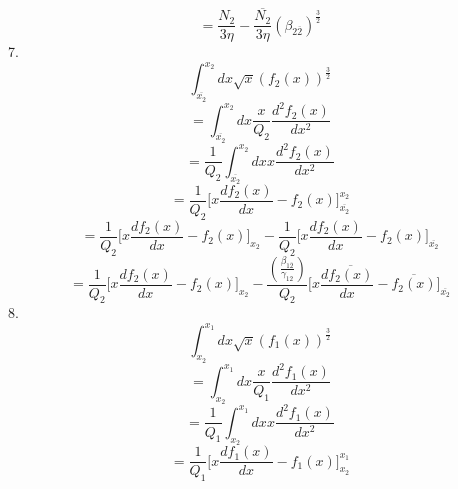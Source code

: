 \documentclass[fleqn, 10pt]{article}
\begin{document}
 \begin{equation}
     = \frac{N_2}{3 \eta} - \frac{\overline{N_2}}{3 \eta} (\beta_{2\overline{2}})^\frac{3}{2}
     \label{91}
 \end{equation}        
 7.              \begin{equation*}
                \int^{x_2}_{\overline{x_2}} dx \sqrt{x} (f_2(x))^\frac{3}{2} 
                \end{equation*}
                \begin{equation*}
                = \int^{x_2}_{\overline{x_2}} dx \frac{x}{Q_2} \frac{d^2f_2(x)}{dx^2} 
                \end{equation*}
                \begin{equation*}
                = \frac{1}{Q_2} \int^{x_2}_{\overline{x_2}} dx x \frac{d^2f_2(x)}{dx^2}
                \end{equation*}
                \begin{equation*}
                = \frac{1}{Q_2} \biggl[ x \frac{df_2(x)}{dx} - f_2(x) \biggr]^{x_2}_{\overline{x_2}}
                \end{equation*}
                \begin{equation*}
                    = \frac{1}{Q_2} \biggl[x \frac{df_2(x)}{dx} - f_2(x) \biggr]_{x_2} - \frac{1}{Q_2} \biggl[x\frac{df_2(x)}{dx} - f_2(x) \biggr]_{\overline{x_2}}
                \end{equation*}
                \begin{equation}
                    = \frac{1}{Q_2} \biggl[x \frac{df_2(x)}{dx} - f_2(x) \biggr]_{x_2} - \frac{\left(\frac{\beta_{1\overline{2}}}{\gamma_{12}}\right)}{Q_2} \Biggl[x \frac{d\overline{f_2(x)}}{dx} - \overline{f_2(x)} \Biggr]_{\overline{x_2}}
                \end{equation}
    8.            \begin{equation*}
               \int^{x_1}_{x_2} dx \sqrt{x} (f_1(x))^\frac{3}{2} 
           \end{equation*}
           \begin{equation*}
               = \int^{x_1}_{x_2} dx \frac{x}{Q_1} \frac{d^2f_1(x)}{dx^2} 
           \end{equation*}
           \begin{equation*}
               = \frac{1}{Q_1} \int^{x_1}_{x_2} dx x \frac{d^2f_1(x)}{dx^2} 
           \end{equation*}
           \begin{equation*}
               = \frac{1}{Q_1} \biggl[ x \frac{df_1(x)}{dx} - f_1(x) \biggr]^{x_1}_{x_2} 
           \end{equation*}
\end{document}
